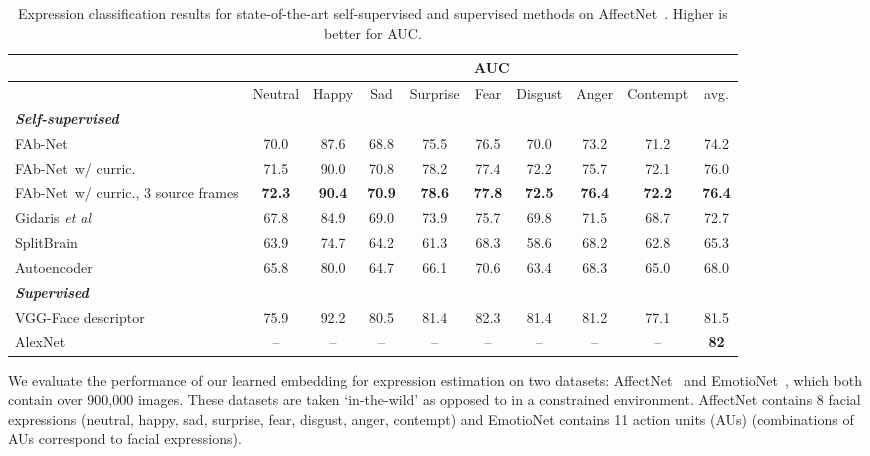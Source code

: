 \documentclass{bmvc2k}
\def\etal{\emph{et al}\bmvaOneDot}
\def\networkname{FAb-Net}
\begin{document}
\begin{table}
\scriptsize
\centering
\begin{tabular}{ | p{2.6cm} | c | c | c | c | c | c | c | c || c |}
\hline
 &  \multicolumn{9}{|c|}{AUC} \\ \hline
 & Neutral & Happy & Sad & Surprise & Fear & Disgust & Anger & Contempt & avg. \\ \hline 
{\textit{\textbf{Self-supervised}}} & & & & & & & & &  \\
 \networkname~ &  {70.0} &  {87.6} &  68.8 &  {75.5} &  {76.5} &  {70.0} &  {73.2} &  {71.2} &  {74.2} \\ 
\networkname~w/ curric. & 71.5 & 90.0 &  70.8 &  78.2 &  77.4 &  72.2 &  75.7 &  72.1 &  76.0  \\ 
  \networkname~w/ curric., 3 source frames &  {\bf 72.3} & {\bf 90.4} &  {\bf 70.9} &  {\bf 78.6} & {\bf 77.8}  &  {\bf 72.5} &  {\bf 76.4} &  {\bf 72.2} &  {\bf 76.4} \\ \hline
Gidaris \etal \cite{gidaris2018unsupervised} & 67.8 & 84.9 & {69.0} & 73.9 & 75.7 & 69.8 & 71.5 & 68.7 & 72.7 \\  
 SplitBrain \cite{zhang2017split} & 63.9 & 74.7 & 64.2 & 61.3 & 68.3 & 58.6 & 68.2 & 62.8 & 65.3 \\
Autoencoder & 65.8 & 80.0 & 64.7 & 66.1 & 70.6 & 63.4 & 68.3 & 65.0 & 68.0 \\ \hline \hline 
{\textit{\textbf{Supervised}}} & & & & & & & & &\\
VGG-Face descriptor~\cite{Parkhi15} & 75.9 & 92.2 & 80.5 & 81.4 & 82.3 & 81.4 & 81.2 & 77.1 & 81.5 \\
 AlexNet~\cite{mollahosseini2017affectnet} & -- & --    & --     & --	   & 	--    & --	& --	&  -- & {\bf 82} \\ \hline
\end{tabular}
\caption{Expression classification results for state-of-the-art self-supervised and supervised methods on AffectNet~\cite{mollahosseini2017affectnet}. Higher is better for AUC.}

\label{tab:affectnetresults}
\end{table}
We evaluate the performance of our learned embedding for expression estimation on two datasets: AffectNet~\cite{mollahosseini2017affectnet} and EmotioNet~\cite{benitez2017emotionet}, which both contain over 900,000 images.
These datasets are taken `in-the-wild' as opposed to in a constrained environment.
AffectNet contains 8 facial expressions (neutral, happy, sad, surprise, fear, disgust, anger, contempt) and EmotioNet contains 11 action units (AUs) (combinations of AUs correspond to facial expressions).
\end{document}
